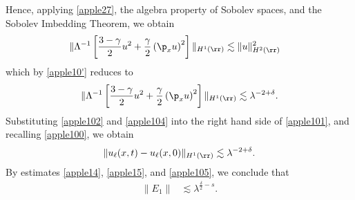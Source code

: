 Hence, applying \eqref{apple27}, the algebra property of Sobolev spaces,
and the Sobolev Imbedding Theorem, we obtain
\begin{equation*}
	\begin{split}
		\|\Lambda^{-1} \left[ \frac{3-\gamma}{2}u^2 +
		\frac{\gamma}{2}\left( \p_x u \right)^2 \right] \|_{H^1(\rr)}
		& \lesssim \|u\|_{H^2(\rr)}^2
	\end{split}
\end{equation*}
which by \eqref{apple10'} reduces to 
\begin{equation}
	\begin{split}
		\|\Lambda^{-1} \left[ \frac{3-\gamma}{2}u^2 +
		\frac{\gamma}{2}\left( \p_x u \right)^2 \right] \|_{H^1(\rr)}
		\lesssim \lambda^{-2 + \delta}.
		\label{apple104}
	\end{split}
\end{equation}
Substituting \eqref{apple102} and \eqref{apple104} into the right hand side of
\eqref{apple101}, and recalling \eqref{apple100}, we obtain
\begin{equation}
	\begin{split}
		\|u_\ell(x,t) - u_\ell(x,0)\|_{H^1(\rr)} \lesssim \lambda^{-2 + \delta}.
		\label{apple105}
	\end{split}
\end{equation}
By estimates \eqref{apple14}, \eqref{apple15}, and \eqref{apple105}, we conclude that 
\begin{equation}
	\begin{split}
		\|E_1\|
		& \lesssim \lambda^{\frac{\delta}{2}-s}.
		\label{apple106}
	\end{split}
\end{equation}
%
